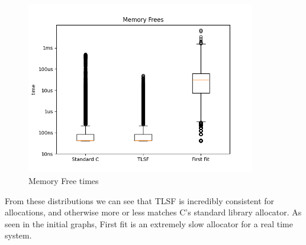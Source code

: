 \documentclass{article}
\begin{document}
\begin{figure}[htbp]
	\centering
	\includegraphics[width=10cm]{boxplots_free}
	\captionsetup{width=10cm}
	\caption{Memory Free times}
\end{figure}
\pagebreak
From these distributions we can see that TLSF is incredibly consistent for allocations, and otherwise more or less matches C's standard library allocator. As seen in the initial graphs, First fit is an extremely slow allocator for a real time system.
\end{document}
